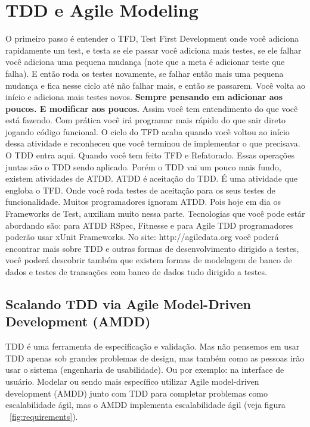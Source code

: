 \documentclass[conference]{IEEEtran}
\begin{document}
\section{TDD e Agile Modeling}
O primeiro passo é entender o TFD, Test First Development onde você adiciona rapidamente um test, e testa se ele passar você adiciona mais testes, se ele falhar você adiciona uma pequena mudança (note que a meta é adicionar teste que falha). E então roda os testes novamente, se falhar então mais uma pequena mudança e fica nesse ciclo até não falhar mais, e então se passarem. Você volta ao início e adiciona mais testes novos. {\bfseries Sempre pensando em adicionar aos poucos. E modificar aos poucos.} Assim você tem entendimento do que você está fazendo. Com prática você irá programar mais rápido do que sair direto jogando código funcional. O ciclo do TFD acaba quando você voltou ao início dessa atividade e reconheceu que você terminou de implementar o que precisava. O TDD entra aqui. Quando você tem feito TFD e Refatorado. Essas operações juntas são o TDD sendo aplicado. Porém o TDD vai um pouco mais fundo, existem atividades de ATDD. ATDD é aceitação do TDD. É uma atividade que engloba o TFD. Onde você roda testes de aceitação para os seus testes de funcionalidade. Muitos programadores ignoram ATDD. Pois hoje em dia os Frameworks de Test, auxiliam muito nessa parte. Tecnologias que você pode estár abordando são: para ATDD RSpec, Fitnesse e para Agile TDD programadores poderão usar xUnit Frameworks. No site: http://agiledata.org você poderá encontrar mais sobre TDD e outras formas de desenvolvimento dirigido a testes, você poderá descobrir também que existem formas de modelagem de banco de dados e testes de transações com banco de dados tudo dirigido a testes.

\subsection{Scalando TDD via Agile Model-Driven Development (AMDD)}
TDD é uma ferramenta de especificação e validação. Mas não pensemos em usar TDD apenas sob grandes problemas de design, mas também como as pessoas irão usar o sistema (engenharia de usabilidade). Ou por exemplo: na interface de usuário. Modelar ou sendo mais específico utilizar Agile model-driven development (AMDD) junto com TDD para completar problemas como escalabilidade ágil, mas o AMDD implementa escalabilidade ágil (veja figura ~\ref{fig:requirements}).
\end{document}
